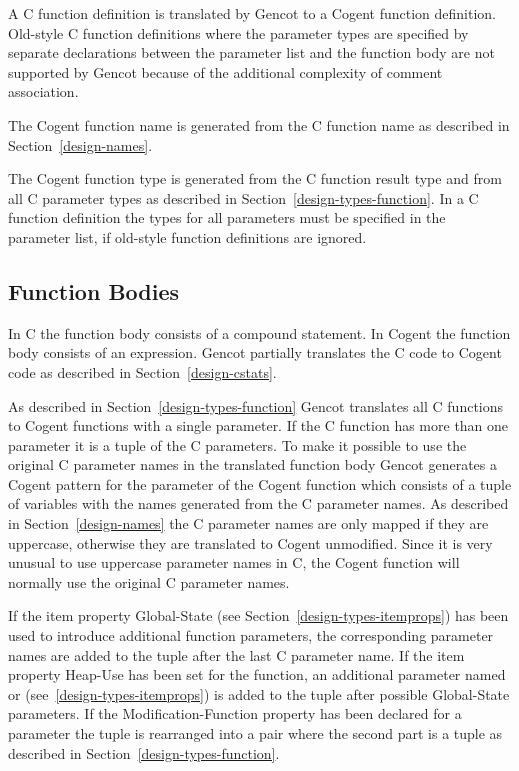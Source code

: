 
A C function definition is translated by Gencot to a Cogent function definition. Old-style C function definitions
where the parameter types are specified by separate declarations between the parameter list and the function body
are not supported by Gencot because of the additional complexity of comment association.

The Cogent function name is generated from the C function name as described in Section~\ref{design-names}.

The Cogent function type is generated from the C function result type and from all C parameter types as described
in Section~\ref{design-types-function}. In a C
function definition the types for all parameters must be specified in the parameter list, if old-style function
definitions are ignored.

\subsection{Function Bodies}
\label{design-fundefs-body}

In C the function body consists of a compound statement. In Cogent
the function body consists of an expression. Gencot partially translates the C code to Cogent code as described 
in Section~\ref{design-cstats}.

As described in Section~\ref{design-types-function} Gencot translates all C functions to Cogent functions with
a single parameter. If the C function has more than one parameter it is a tuple of the C parameters. To make it
possible to use the original C parameter names in the translated function body
Gencot generates a Cogent pattern for the parameter of the Cogent function which 
consists of a tuple of variables with the names generated from the C parameter names. As described in 
Section~\ref{design-names} the C parameter names are only mapped if they are uppercase, otherwise they are
translated to Cogent unmodified. Since it is very unusual
to use uppercase parameter names in C, the Cogent function will normally use the original C parameter names.

If the item property Global-State (see Section~\ref{design-types-itemprops}) has been used to introduce additional 
function parameters, the corresponding parameter names are added to the tuple after the last C parameter name.
If the item property Heap-Use has been set for the function, an additional parameter named  or 
 (see~\ref{design-types-itemprops}) is added to the tuple after possible Global-State parameters.
If the Modification-Function property has been declared for a parameter the tuple is rearranged into a pair 
where the second part is a tuple as described in Section~\ref{design-types-function}.

